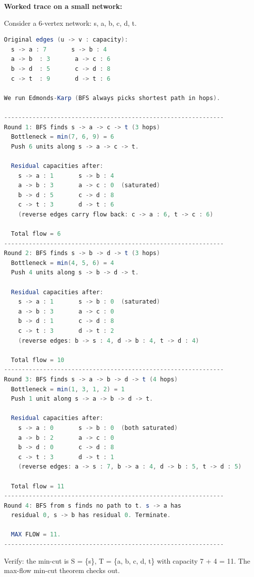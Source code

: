 \textbf{Worked trace on a small network:}

Consider a 6-vertex network: s, a, b, c, d, t.

\begin{lstlisting}[language=Java]
Original edges (u -> v : capacity):
  s -> a : 7       s -> b : 4
  a -> b  : 3       a -> c : 6
  b -> d  : 5       c -> d : 8
  c -> t  : 9       d -> t : 6

We run Edmonds-Karp (BFS always picks shortest path in hops).

--------------------------------------------------------------
Round 1: BFS finds s -> a -> c -> t (3 hops)
  Bottleneck = min(7, 6, 9) = 6
  Push 6 units along s -> a -> c -> t.

  Residual capacities after:
    s -> a : 1       s -> b : 4
    a -> b : 3       a -> c : 0  (saturated)
    b -> d : 5       c -> d : 8
    c -> t : 3       d -> t : 6
    (reverse edges carry flow back: c -> a : 6, t -> c : 6)

  Total flow = 6
--------------------------------------------------------------
Round 2: BFS finds s -> b -> d -> t (3 hops)
  Bottleneck = min(4, 5, 6) = 4
  Push 4 units along s -> b -> d -> t.

  Residual capacities after:
    s -> a : 1       s -> b : 0  (saturated)
    a -> b : 3       a -> c : 0
    b -> d : 1       c -> d : 8
    c -> t : 3       d -> t : 2
    (reverse edges: b -> s : 4, d -> b : 4, t -> d : 4)

  Total flow = 10
--------------------------------------------------------------
Round 3: BFS finds s -> a -> b -> d -> t (4 hops)
  Bottleneck = min(1, 3, 1, 2) = 1
  Push 1 unit along s -> a -> b -> d -> t.

  Residual capacities after:
    s -> a : 0       s -> b : 0  (both saturated)
    a -> b : 2       a -> c : 0
    b -> d : 0       c -> d : 8
    c -> t : 3       d -> t : 1
    (reverse edges: a -> s : 7, b -> a : 4, d -> b : 5, t -> d : 5)

  Total flow = 11
--------------------------------------------------------------
Round 4: BFS from s finds no path to t. s -> a has
  residual 0, s -> b has residual 0. Terminate.

  MAX FLOW = 11.
--------------------------------------------------------------
\end{lstlisting}

Verify: the min-cut is S = \{s\}, T = \{a, b, c, d, t\} with capacity 7 + 4 = 11. The max-flow min-cut theorem checks out.


